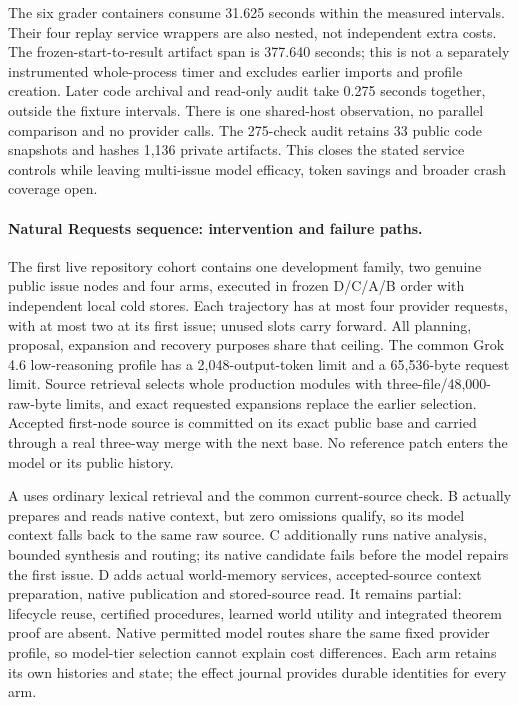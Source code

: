 The six grader containers consume 31.625 seconds within the measured
intervals. Their four replay service wrappers are also nested, not independent
extra costs. The frozen-start-to-result artifact span is 377.640 seconds;
this is not a separately instrumented whole-process timer and excludes earlier
imports and profile creation. Later code archival and read-only audit take
0.275 seconds together, outside the fixture intervals. There is one
shared-host observation, no parallel comparison and no provider calls.
The 275-check audit retains 33 public code snapshots and hashes 1,136
private artifacts. This closes the stated service controls while leaving
multi-issue model efficacy, token savings and broader crash coverage open.

\paragraph{Natural Requests sequence: intervention and failure paths.}
The first live repository cohort contains one development family, two genuine
public issue nodes and four arms, executed in frozen D/C/A/B order with
independent local cold stores. Each trajectory has at most four provider
requests, with at most two at its first issue; unused slots carry forward.
All planning, proposal, expansion and recovery purposes share that ceiling.
The common Grok 4.6 low-reasoning profile has a 2,048-output-token limit and
a 65,536-byte request limit. Source retrieval selects whole production modules
with three-file/48,000-raw-byte limits, and exact requested expansions replace
the earlier selection. Accepted first-node source is committed on its exact
public base and carried through a real three-way merge with the next base.
No reference patch enters the model or its public history.

A uses ordinary lexical retrieval and the common current-source check. B
actually prepares and reads native context, but zero omissions qualify, so its
model context falls back to the same raw source. C additionally runs native
analysis, bounded synthesis and routing; its native candidate fails before
the model repairs the first issue. D adds actual world-memory services,
accepted-source context preparation, native publication and stored-source
read. It remains partial: lifecycle reuse, certified procedures, learned
world utility and integrated theorem proof are absent. Native permitted model
routes share the same fixed provider profile, so model-tier selection cannot
explain cost differences. Each arm retains its own histories and state; the
effect journal provides durable identities for every arm.

